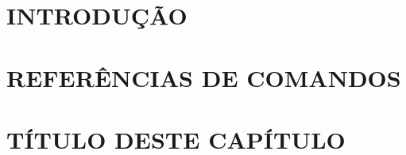 \documentclass[pdftex,12pt,oneside,a4paper,english,french,spanish,brazil]{abntex2}
\begin{document}
\begin{sloppypar}
            \hypersetup{
                colorlinks=true,       %
                linkcolor=black,       %
                citecolor=black,       %
                filecolor=black,       %
                urlcolor=black,        %
                bookmarksopen=true,    %
            }
            
            \tableofcontents*
            
            \cleardoublepage
            
            \renewcommand\listfigurename{LISTA DE FIGURAS}
            \listoffigures 
            \cleardoublepage

            \renewcommand\listtablename{LISTA DE TABELAS}
            \listoftables

            \cleardoublepage

                    
            
            

            
          \textual
          
            \chapter{INTRODUÇÃO}\label{cap:introducao}
            

            \chapter{REFERÊNCIAS DE COMANDOS}\label{cap:refcomandos}
            

            \chapter{TÍTULO DESTE CAPÍTULO}\label{cap:capitulo1}
            
          

\end{sloppypar}
\end{document}
